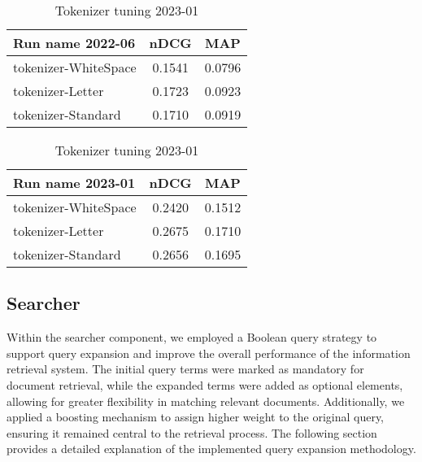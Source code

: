 \begin{table}[ht]
    \centering
    \begin{minipage}{0.48\textwidth}
        \centering
        \begin{tabular}{ |l|c|c| }
            \hline
            Run name 2022-06 & nDCG & MAP \\ [0.5ex]
            \hline\hline
            tokenizer-WhiteSpace & 0.1541 & 0.0796 \\
            \rowcolor{yellow}
            tokenizer-Letter & 0.1723 & 0.0923 \\
            tokenizer-Standard & 0.1710 & 0.0919 \\
            \hline
        \end{tabular}
        \caption{Tokenizer tuning 2022-06}
        \label{tab:tokenizer-2022}
    \end{minipage}
    \hfill
    \begin{minipage}{0.48\textwidth}
        \centering
        \begin{tabular}{ |l|c|c| }
            \hline
            Run name 2023-01 & nDCG & MAP \\ [0.5ex]
            \hline\hline
            tokenizer-WhiteSpace & 0.2420 & 0.1512 \\
            \rowcolor{yellow}
            tokenizer-Letter & 0.2675 & 0.1710 \\
            tokenizer-Standard & 0.2656 & 0.1695 \\
            \hline
        \end{tabular}
        \caption{Tokenizer tuning 2023-01}
        \label{tab:tokenizer-2023}
    \end{minipage}
\end{table}

\subsection{Searcher}
\label{subsec:searcher}
Within the searcher component, we employed a Boolean query strategy to support query expansion and improve the overall performance of the information retrieval system. The initial query terms were marked as mandatory for document retrieval, while the expanded terms were added as optional elements, allowing for greater flexibility in matching relevant documents. Additionally, we applied a boosting mechanism to assign higher weight to the original query, ensuring it remained central to the retrieval process. The following section provides a detailed explanation of the implemented query expansion methodology.

